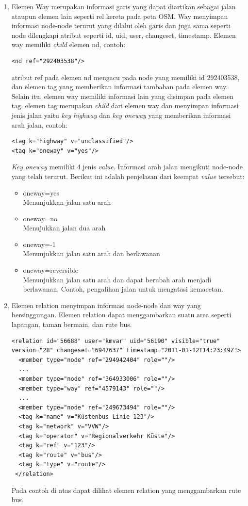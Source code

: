 \begin{itemize}
\begin{enumerate}
\item Elemen Way merupakan informasi garis yang dapat diartikan sebagai jalan
ataupun elemen lain seperti rel kereta pada peta OSM. Way menyimpan informasi
node-node terurut yang dilalui oleh garis dan juga sama seperti node dilengkapi
atribut seperti id, uid, user, changeset, timestamp. Elemen way memiliki \textit{child}
elemen nd, contoh:
\begin{verbatim}
<nd ref="292403538"/>
\end{verbatim}
atribut ref pada elemen nd mengacu pada node yang memiliki id 292403538, dan
elemen tag yang memberikan informasi tambahan pada elemen way. Selain itu,
elemen way memiliki informasi lain yang disimpan pada elemen tag, elemen tag
merupakan \textit{child} dari elemen way dan menyimpan informasi jenis jalan
yaitu \textit{key highway} dan \textit{key oneway} yang memberikan informasi
arah jalan, contoh:
\begin{verbatim}
<tag k="highway" v="unclassified"/>
<tag k="oneway" v="yes"/>
\end{verbatim}
\textit{Key oneway} memiliki 4 jenis \textit{value}. Informasi arah jalan
mengikuti node-node yang telah terurut. Berikut ini adalah
penjelasan dari keempat \textit{value} tersebut:
\begin{itemize}
  \item oneway=yes \\
  Menunjukkan jalan satu arah
  
  \item oneway=no \\
  Menujukkan jalan dua arah
  
  \item oneway=-1 \\
  Menunjukkan jalan satu arah dan berlawanan
  
  \item oneway=reversible \\
  Menunjukkan jalan satu arah dan dapat berubah arah menjadi berlawanan. Contoh,
  pengalihan jalan untuk mengatasi kemacetan.
\end{itemize}

\item Elemen relation menyimpan informasi node-node dan way yang bersinggungan.
Elemen relation dapat menggambarkan suatu area seperti lapangan, taman
bermain, dan rute bus.
\begin{lstlisting}
<relation id="56688" user="kmvar" uid="56190" visible="true" version="28" changeset="6947637" timestamp="2011-01-12T14:23:49Z">
  <member type="node" ref="294942404" role=""/>
  ...
  <member type="node" ref="364933006" role=""/>
  <member type="way" ref="4579143" role=""/>
  ...
  <member type="node" ref="249673494" role=""/>
  <tag k="name" v="Küstenbus Linie 123"/>
  <tag k="network" v="VVW"/>
  <tag k="operator" v="Regionalverkehr Küste"/>
  <tag k="ref" v="123"/>
  <tag k="route" v="bus"/>
  <tag k="type" v="route"/>
 </relation>
\end{lstlisting}
Pada contoh di atas dapat dilihat elemen relation yang menggambarkan rute bus.
\end{enumerate}
\end{itemize}

